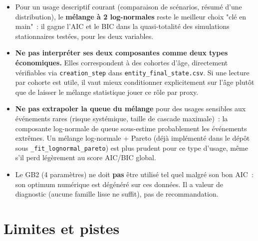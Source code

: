\documentclass[11pt,a4paper]{article}
\begin{document}
\begin{itemize}
  \item Pour un usage descriptif courant (comparaison de scénarios,
  résumé d'une distribution), le \textbf{mélange à 2 log-normales} reste
  le meilleur choix "clé en main"~: il gagne l'AIC et le BIC dans la
  quasi-totalité des simulations stationnaires testées, pour les deux
  variables.
  \item \textbf{Ne pas interpréter ses deux composantes comme deux types
  économiques.} Elles correspondent à des cohortes d'âge, directement
  vérifiables via \texttt{creation\_step} dans
  \texttt{entity\_final\_state.csv}. Si une lecture par cohorte est
  utile, il vaut mieux conditionner explicitement sur l'âge plutôt que de
  laisser le mélange statistique jouer ce rôle par proxy.
  \item \textbf{Ne pas extrapoler la queue du mélange} pour des usages
  sensibles aux événements rares (risque systémique, taille de cascade
  maximale)~: la composante log-normale de queue sous-estime
  probablement les événements extrêmes. Un mélange log-normale + Pareto
  (déjà implémenté dans le dépôt sous
  \texttt{\_fit\_lognormal\_pareto}) est plus prudent pour ce type
  d'usage, même s'il perd légèrement au score AIC/BIC global.
  \item Le GB2 (4 paramètres) ne doit \textbf{pas} être utilisé tel quel
  malgré son bon AIC~: son optimum numérique est dégénéré sur ces
  données. Il a valeur de diagnostic (aucune famille lisse ne suffit),
  pas de recommandation.
\end{itemize}

\section{Limites et pistes}
\end{document}

